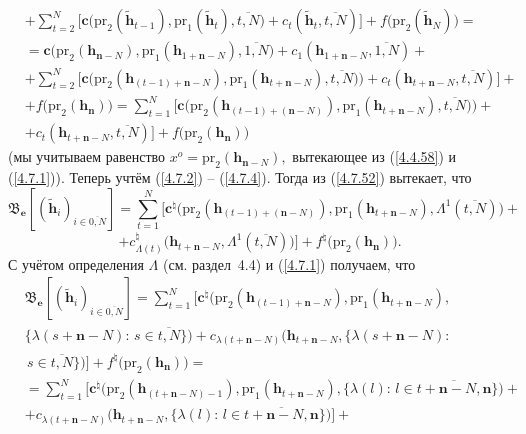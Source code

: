 \documentclass[11pt,twoside]{report}
\newcommand{\ov}{\overline}
\newcommand{\La}{\Lambda}
\newcommand{\la}{\lambda}
\newcommand{\zc}{{\mathbf c}}
\newcommand{\nn}{{\mathbf n}}
\begin{document}
{{\begin{eqnarray}
&\nonumber\\
&+ \sum\limits_{t=2}^N\bigl[\zc\bigl(\mathrm{pr}_2(\tilde{\mathbf{h}}_{t-1}),\mathrm{pr}_1
(\tilde{\mathbf{h}}_t),\ov{t,N}\bigl) +
c_t(\tilde{\mathbf{h}}_t,\ov{t,N})\bigl] + f\bigl(\mathrm{pr}_2(\tilde{\mathbf{h}}_N)\bigl)=
&\nonumber\\
&=\zc\bigl(\mathrm{pr}_2(\mathbf{h}_{\nn-N}),\mathrm{pr}_1(\mathbf{h}_{1+\nn-N}),\ov{1,N}\bigl) +
c_1(\mathbf{h}_{1+\nn-N},\ov{1,N}) +
&\nonumber\\
&+\sum\limits_{t=2}^N\bigl[\zc\bigl(\mathrm{pr}_2(\mathbf{h}_{(t-1)+\nn-N}),\mathrm{pr}_1
(\mathbf{h}_{t+\nn-N}),\ov{t,N})\bigl) + c_t(\mathbf{h}_{t+\nn-N},\ov{t,N})\bigl]+
&\nonumber\\
&+f\bigl(\mathrm{pr}_2(\mathbf{h}_\nn)\bigl)=
\sum\limits_{t=1}^N\bigl[\zc\bigl(\mathrm{pr}_2(\mathbf{h}_{(t-1)+(\nn-N)}),\mathrm{pr}_1
(\mathbf{h}_{t+\nn-N}),\ov{t,N})\bigl) +
&\nonumber\\
&+c_t(\mathbf{h}_{t+\nn-N},\ov{t,N})\bigl]+
f\bigl(\mathrm{pr}_2(\mathbf{h}_\nn)\bigl)
&\label{4.7.52}
\end{eqnarray}
(мы учитываем равенство $x^o= \mathrm{pr}_2(\mathbf{h}_{\nn-N}),$ вытекающее из (\ref{4.4.58}) и
(\ref{4.7.1})). Теперь учтём (\ref{4.7.2}) -- (\ref{4.7.4}). Тогда из (\ref{4.7.52}) вытекает, что
$$\mathfrak{B}_\mathbf{e}[(\tilde{\mathbf{h}}_i)_{i\in\ov{0,N}}] =
\sum\limits_{t=1}^N\bigl[\zc^\natural\bigl(\mathrm{pr}_2(\mathbf{h}_{(t-1)+(\nn-N)}),\mathrm{pr}_1
(\mathbf{h}_{t+\nn-N}),\La^1(\ov{t,N})\bigl) +$$ $$+ c_{\La(t)}^{\natural}\bigl(\mathbf{h}_{t+\nn-N},
\La^1(\ov{t,N})\bigl)\bigl]+ f^\natural\bigl(\mathrm{pr}_2(\mathbf{h}_\nn)\bigl).
$$
С учётом определения $\La$ (см. раздел~4.4) и (\ref{4.7.1}) получаем, что
\begin{eqnarray}
&\mathfrak{B}_\mathbf{e}[(\tilde{\mathbf{h}}_i)_{i\in\ov{0,N}}] =
\sum\limits_{t=1}^N\bigl[\zc^\natural\bigl(\mathrm{pr}_2(\mathbf{h}_{(t-1)+\nn-N}),\mathrm{pr}_1
(\mathbf{h}_{t+\nn-N}),
&\nonumber\\
&\{\la(s+\nn-N):\,s\in\ov{t,N}\}\bigl) + c_{\la(t+\nn-N)}\bigl(\mathbf{h}_{t+\nn-N},\{\la(s+\nn-N):
&\nonumber\\
&\,s\in\ov{t,N}\}\bigl)\bigl]+
f^\natural\bigl(\mathrm{pr}_2(\mathbf{h}_\nn)\bigl)=
&\nonumber\\
&= \sum\limits_{t=1}^N\bigl[\zc^\natural\bigl(\mathrm{pr}_2(\mathbf{h}_{(t+\nn-N)-1}),\mathrm{pr}_1
(\mathbf{h}_{t+\nn-N}),\{\la(l):\,l\in\ov{t+\nn-N,\nn}\}\bigl)+
&\nonumber\\
&+c_{\la(t+\nn-N)}\bigl(\mathbf{h}_{t+\nn-N},\{\la(l):\,l\in \ov{t+\nn-N,\nn}\}\bigl)\bigl]+

\end{eqnarray}}}
\end{document}
